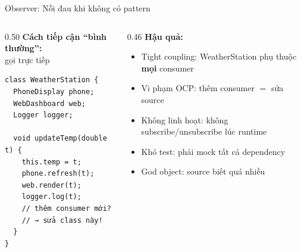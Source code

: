 \begin{frame}[fragile]{Observer: Nỗi đau khi không có pattern}
  \begin{columns}[T]
    \begin{column}{0.50\textwidth}
      \textbf{Cách tiếp cận ``bình thường'':}\\[0.2em]
      {\small gọi trực tiếp}

      \vspace{0.3em}
      \footnotesize
      \begin{verbatim}
class WeatherStation {
  PhoneDisplay phone;
  WebDashboard web;
  Logger logger;

  void updateTemp(double t) {
    this.temp = t;
    phone.refresh(t);
    web.render(t);
    logger.log(t);
    // thêm consumer mới?
    // → sửa class này!
  }
}
      \end{verbatim}
    \end{column}
    \begin{column}{0.46\textwidth}
      \textbf{Hậu quả:}
      \begin{itemize}
        \item \textcolor{myred}{Tight coupling}: WeatherStation phụ thuộc \textbf{mọi} consumer
        \item \textcolor{myred}{Vi phạm OCP}: thêm consumer $=$ sửa source
        \item \textcolor{myred}{Không linh hoạt}: không subscribe/unsubscribe lúc runtime
        \item \textcolor{myred}{Khó test}: phải mock tất cả dependency
        \item \textcolor{myred}{God object}: source biết quá nhiều
      \end{itemize}
    \end{column}
  \end{columns}
\end{frame}

